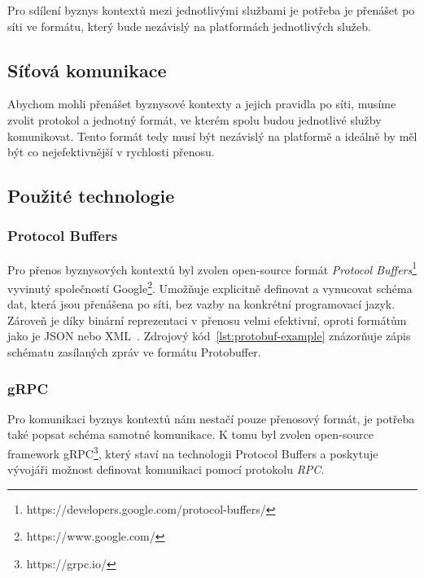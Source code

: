 
Pro sdílení byznys kontextů mezi jednotlivými službami
je potřeba je přenášet po síti ve formátu, který bude
nezávislý na platformách jednotlivých služeb.

\subsection{Síťová komunikace}

Abychom mohli přenášet byznysové kontexty a jejich pravidla
po síti, musíme zvolit protokol a jednotný formát, ve kterém
spolu budou jednotlivé služby komunikovat.
Tento formát tedy musí být nezávislý na platformě a ideálně
by měl být co nejefektivnější v rychlosti přenosu.

\subsection{Použité technologie}

\subsubsection{Protocol Buffers}


Pro přenos byznysových kontextů byl zvolen open-source formát
\textit{Protocol Buffers}\footnote{
https://developers.google.com/protocol-buffers/
}
vyvinutý společností Google\footnote{
https://www.google.com/
}. Umožňuje explicitně definovat a vynucovat schéma dat,
která jsou přenášena po síti, bez vazby na konkrétní programovací
jazyk. Zároveň je díky binární reprezentaci v přenosu velmi efektivní,
oproti formátům jako je JSON nebo XML~\cite{varda2008protocol}.
Zdrojový kód~\ref{lst:protobuf-example} znázorňuje zápis schématu
zasílaných zpráv ve formátu Protobuffer.




\subsubsection{gRPC}

Pro komunikaci byznys kontextů nám nestačí pouze přenosový formát,
je potřeba také popsat schéma samotné komunikace. K tomu byl zvolen
open-source framework gRPC\footnote{
https://grpc.io/
}, který staví na technologii Protocol Buffers a poskytuje vývojáři
možnost definovat komunikaci pomocí protokolu \textit{RPC}. %

